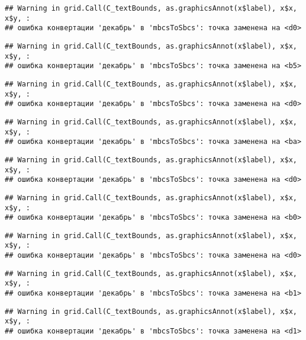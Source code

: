 \documentclass[
]{article}
\begin{document}
\begin{verbatim}
## Warning in grid.Call(C_textBounds, as.graphicsAnnot(x$label), x$x, x$y, :
## ошибка конвертации 'декабрь' в 'mbcsToSbcs': точка заменена на <d0>
\end{verbatim}

\begin{verbatim}
## Warning in grid.Call(C_textBounds, as.graphicsAnnot(x$label), x$x, x$y, :
## ошибка конвертации 'декабрь' в 'mbcsToSbcs': точка заменена на <b5>
\end{verbatim}

\begin{verbatim}
## Warning in grid.Call(C_textBounds, as.graphicsAnnot(x$label), x$x, x$y, :
## ошибка конвертации 'декабрь' в 'mbcsToSbcs': точка заменена на <d0>
\end{verbatim}

\begin{verbatim}
## Warning in grid.Call(C_textBounds, as.graphicsAnnot(x$label), x$x, x$y, :
## ошибка конвертации 'декабрь' в 'mbcsToSbcs': точка заменена на <ba>
\end{verbatim}

\begin{verbatim}
## Warning in grid.Call(C_textBounds, as.graphicsAnnot(x$label), x$x, x$y, :
## ошибка конвертации 'декабрь' в 'mbcsToSbcs': точка заменена на <d0>
\end{verbatim}

\begin{verbatim}
## Warning in grid.Call(C_textBounds, as.graphicsAnnot(x$label), x$x, x$y, :
## ошибка конвертации 'декабрь' в 'mbcsToSbcs': точка заменена на <b0>
\end{verbatim}

\begin{verbatim}
## Warning in grid.Call(C_textBounds, as.graphicsAnnot(x$label), x$x, x$y, :
## ошибка конвертации 'декабрь' в 'mbcsToSbcs': точка заменена на <d0>
\end{verbatim}

\begin{verbatim}
## Warning in grid.Call(C_textBounds, as.graphicsAnnot(x$label), x$x, x$y, :
## ошибка конвертации 'декабрь' в 'mbcsToSbcs': точка заменена на <b1>
\end{verbatim}

\begin{verbatim}
## Warning in grid.Call(C_textBounds, as.graphicsAnnot(x$label), x$x, x$y, :
## ошибка конвертации 'декабрь' в 'mbcsToSbcs': точка заменена на <d1>
\end{verbatim}
\end{document}
